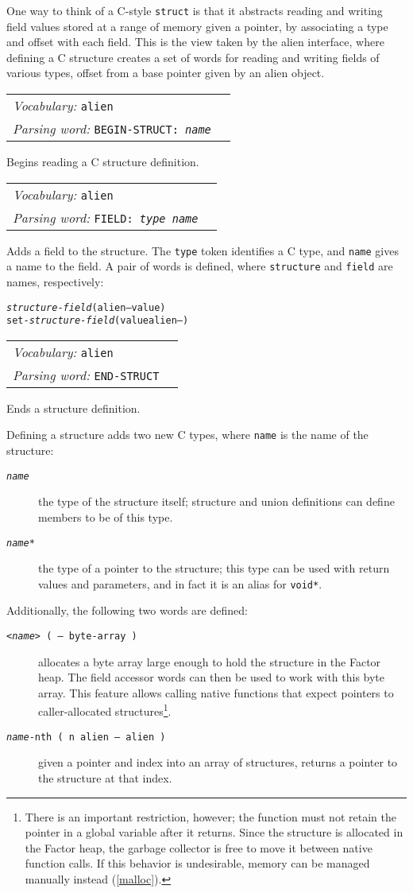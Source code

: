 \documentclass{book}
\newcommand{\vocabulary}[1]{\emph{Vocabulary:} \texttt{#1}&\\}
\newcommand{\parsingword}[2]{\index{\texttt{#1}}\emph{Parsing word:} \texttt{#2}&\\}
\newcommand{\wordtable}[1]{

\begin{tabularx}{12cm}[t]{lX}
\hline
#1
\hline
\end{tabularx}

}
\begin{document}
One way to think of a C-style \verb|struct| is that it abstracts reading and writing field values stored at a range of memory given a pointer, by associating a type and offset with each field. This is the view taken by the alien interface, where defining a C structure creates a set of words for reading and writing fields of various types, offset from a base pointer given by an alien object.

\wordtable{
\vocabulary{alien}
\parsingword{BEGIN-STRUCT:}{BEGIN-STRUCT: \emph{name}}
}
Begins reading a C structure definition.
\wordtable{
\vocabulary{alien}
\parsingword{FIELD:}{FIELD: \emph{type} \emph{name}}
}
Adds a field to the structure. The \verb|type| token identifies a C type, and \verb|name| gives a name to the field. A pair of words is defined, where \verb|structure| and \verb|field| are names, respectively:
\begin{alltt}
\emph{structure}-\emph{field} ( alien -- value )
set-\emph{structure}-\emph{field} ( value alien -- )
\end{alltt}

\wordtable{
\vocabulary{alien}
\parsingword{END-STRUCT}{END-STRUCT}
}
Ends a structure definition.

Defining a structure adds two new C types, where \verb|name| is the name of the structure:
\begin{description}
\item[\texttt{\emph{name}}] the type of the structure itself; structure and union definitions can define members to be of this type.
\item[\texttt{\emph{name}*}] the type of a pointer to the structure; this type can be used with return values and parameters, and in fact it is an alias for \texttt{void*}.
\end{description}
Additionally, the following two words are defined:
\begin{description}
\item[\texttt{<\emph{name}> ( -- byte-array )}] allocates a byte array large enough to hold the structure in the Factor heap. The field accessor words can then be used to work with this byte array. This feature allows calling native functions that expect pointers to caller-allocated structures\footnote{
There is an important restriction, however; the function must not retain the pointer in a global variable after it returns. Since the structure is allocated in the Factor heap, the garbage collector is free to move it between native function calls. If this behavior is undesirable, memory can be managed manually instead (\ref{malloc}).}.
\item[\texttt{\emph{name}-nth ( n alien -- alien )}] given a pointer and index into an array of structures, returns a pointer to the structure at that index.
\end{description}
\end{document}
